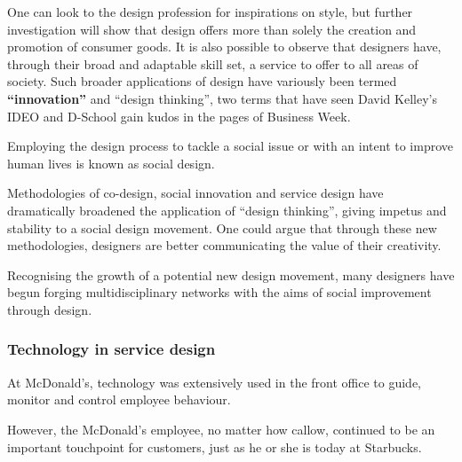 
One can look to the design profession for inspirations on style, but further investigation will show that design offers more than solely the creation and promotion of consumer goods. It is also possible to observe that designers have, through their broad and adaptable skill set, a service to offer to all areas of society. Such broader applications of design have variously been termed \textbf{“innovation”} %
and “design thinking”, two terms that have seen David Kelley’s IDEO and D-School gain kudos in the pages of Business Week.

Employing the design process to tackle a social issue or with an intent to improve human lives is known as social design.

Methodologies of co-design, social innovation and service design have dramatically broadened the application of “design thinking”, giving impetus and stability to a social design movement. One could argue that through these new methodologies, designers are better communicating the value of their creativity.

Recognising the growth of a potential new design movement, many designers have begun forging multidisciplinary networks with the aims of social improvement through design.

\subsubsection{Technology in service design}
At McDonald’s, technology was extensively used in the front office to guide, monitor and control employee behaviour.

However, the McDonald’s employee, no matter how callow, continued to be an important touchpoint for customers, just as he or she is today at Starbucks.

